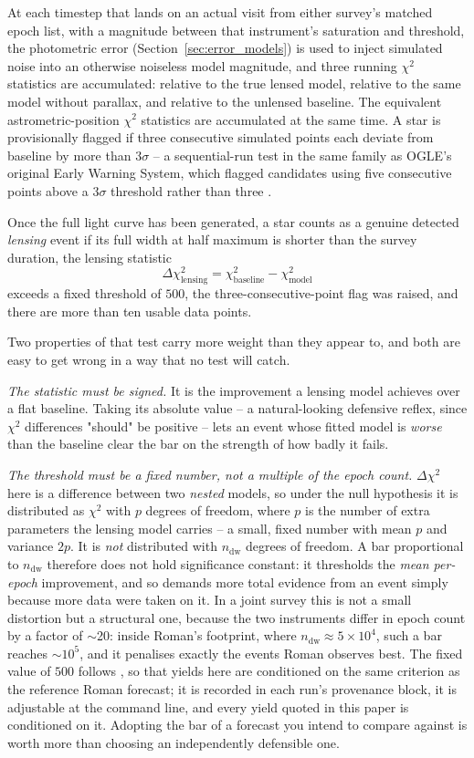 \documentclass[english,10pt,a4paper]{article}
\begin{document}
	At each timestep that lands on an actual visit from either survey's matched epoch list, with a magnitude between that instrument's saturation and threshold, the photometric error (Section~\ref{sec:error_models}) is used to inject simulated noise into an otherwise noiseless model magnitude, and three running $\chi^2$ statistics are accumulated: relative to the true lensed model, relative to the same model without parallax, and relative to the unlensed baseline. The equivalent astrometric-position $\chi^2$ statistics are accumulated at the same time. A star is provisionally flagged if three consecutive simulated points each deviate from baseline by more than $3\sigma$ -- a sequential-run test in the same family as OGLE's original Early Warning System, which flagged candidates using five consecutive points above a $3\sigma$ threshold rather than three \cite{Udalski1994EWS}.
	
	Once the full light curve has been generated, a star counts as a genuine detected \emph{lensing} event if its full width at half maximum is shorter than the survey duration, the lensing statistic
	\[
	\Delta\chi^2_{\mathrm{lensing}} = \chi^2_{\mathrm{baseline}} - \chi^2_{\mathrm{model}}
	\]
	exceeds a fixed threshold of $500$, the three-consecutive-point flag was raised, and there are more than ten usable data points.

	Two properties of that test carry more weight than they appear to, and both are easy to get wrong in a way that no test will catch.

	\emph{The statistic must be signed.} It is the improvement a lensing model achieves over a flat baseline. Taking its absolute value -- a natural-looking defensive reflex, since $\chi^2$ differences "should" be positive -- lets an event whose fitted model is \emph{worse} than the baseline clear the bar on the strength of how badly it fails.

	\emph{The threshold must be a fixed number, not a multiple of the epoch count.} $\Delta\chi^2$ here is a difference between two \emph{nested} models, so under the null hypothesis it is distributed as $\chi^2$ with $p$ degrees of freedom, where $p$ is the number of extra parameters the lensing model carries -- a small, fixed number with mean $p$ and variance $2p$. It is \emph{not} distributed with $n_{\mathrm{dw}}$ degrees of freedom. A bar proportional to $n_{\mathrm{dw}}$ therefore does not hold significance constant: it thresholds the \emph{mean per-epoch} improvement, and so demands more total evidence from an event simply because more data were taken on it. In a joint survey this is not a small distortion but a structural one, because the two instruments differ in epoch count by a factor of $\sim$20: inside Roman's footprint, where $n_{\mathrm{dw}}\approx5\times10^{4}$, such a bar reaches $\sim10^{5}$, and it penalises exactly the events Roman observes best. The fixed value of $500$ follows \cite{penny2019predictions}, so that yields here are conditioned on the same criterion as the reference Roman forecast; it is recorded in each run's provenance block, it is adjustable at the command line, and every yield quoted in this paper is conditioned on it. Adopting the bar of a forecast you intend to compare against is worth more than choosing an independently defensible one.
\end{document}
